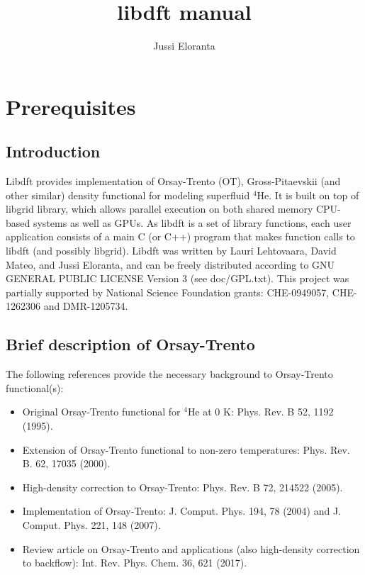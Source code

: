 \documentclass[12pt,letterpaper]{report}
\author{Jussi Eloranta}
\title{libdft manual}
\begin{document}
\maketitle

\chapter{Prerequisites}

\section{Introduction}

Libdft provides implementation of Orsay-Trento (OT), Gross-Pitaevskii (and other 
similar) density functional for modeling superfluid $^4$He. It is built on top 
of libgrid library, which allows parallel execution on both shared memory 
CPU-based systems as well as GPUs. As libdft is a set of library functions,
each user application consists of a main C (or C++) program that makes
function calls to libdft (and possibly libgrid). 
Libdft was written by Lauri Lehtovaara, David Mateo, and Jussi Eloranta, and 
can be freely distributed according to GNU GENERAL PUBLIC LICENSE Version 3 
(see doc/GPL.txt). This project was partially supported by National Science 
Foundation grants: CHE-0949057, CHE-1262306 and DMR-1205734.

\section{Brief description of Orsay-Trento}

The following references provide the necessary background to Orsay-Trento functional(s):
\begin{itemize}
\item Original Orsay-Trento functional for $^4$He at 0 K: Phys. Rev. B 52, 1192 (1995).
\item Extension of Orsay-Trento functional to non-zero temperatures: Phys. Rev. B. 62, 17035 (2000).
\item High-density correction to Orsay-Trento: Phys. Rev. B 72, 214522 (2005).
\item Implementation of Orsay-Trento: J. Comput. Phys. 194, 78 (2004) and J. Comput. Phys. 221, 148 (2007).
\item Review article on Orsay-Trento and applications (also high-density correction to backflow): Int. Rev. Phys. Chem. 36, 621 (2017).
\end{itemize}
\end{document}
